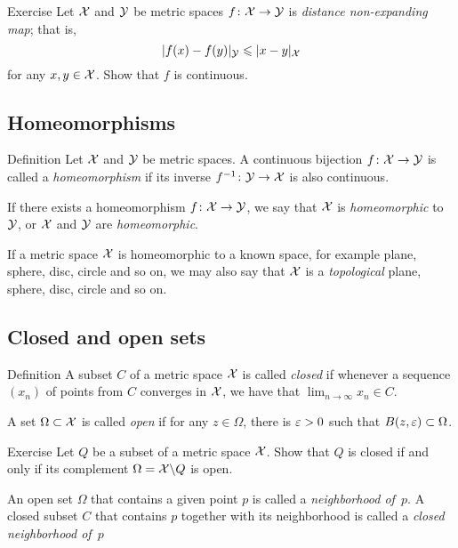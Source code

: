 \begin{thm}{Exercise}\label{ex:shrt=>continuous}
Let ${\mathcal{X}}$ and $\mathcal{Y}$ be metric spaces $f\colon\mathcal{X}\to \mathcal{Y}$ is \emph{distance non-expanding map}; that is, 
\[\dist{f(x)}{f(y)}{\spc{Y}}\le \dist{x}{y}{\spc{X}}\]
for any $x,y\in \mathcal{X}$.
Show that $f$ is continuous.
\end{thm}

\subsection*{Homeomorphisms}

\begin{thm}{Definition}
Let $\mathcal{X}$ and $\mathcal{Y}$ be metric spaces.
A continuous bijection $f\colon\mathcal{X}\to \mathcal{Y}$ 
is called a \emph{homeomorphism} 
if its inverse $f^{-1}\:\spc{Y}\z\to \spc{X}$ is also continuous.

If there exists a homeomorphism $f\colon\mathcal{X}\to \mathcal{Y}$,
we say that ${\mathcal{X}}$ is {}\emph{homeomorphic} to $\mathcal{Y}$,
or  $\mathcal{X}$ and $\mathcal{Y}$ are {}\emph{homeomorphic}.
\end{thm}

If a metric space $\mathcal{X}$ is homeomorphic to a known space, for example plane, sphere, disc, circle and so on,
we may also say that $\mathcal{X}$ is a \emph{topological} plane, sphere, disc, circle and so on.

\subsection*{Closed and open sets}

\begin{thm}{Definition}
A subset $C$ of a metric space $\mathcal{X}$ is called \emph{closed} if whenever a sequence $(x_n)$ of points from $C$ converges in $\mathcal{X}$, we have that $\lim_{n\to\infty} x_n \in C$.

A set $\Omega \subset \mathcal{X}$ is called \emph{open} if for any $z\in \Omega$, 
there is $\varepsilon>0$ such that $B(z,\varepsilon)\subset\Omega$.
\end{thm}

\begin{thm}{Exercise}\label{ex:close-open}
Let $Q$ be a subset of a metric space $\mathcal{X}$.
Show that $Q$ is closed if and only if its complement $\Omega=\mathcal{X}\backslash Q$ is open.
\end{thm}

An open set $\Omega$ that contains a given point $p$ is called a \emph{neighborhood of~$p$}.
A closed subset $C$ that contains $p$ together with its neighborhood is called a {}\emph{closed neighborhood of~$p$}
